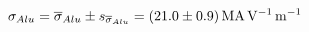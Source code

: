 
\begin{equation}
    \sigma_{Alu}
        = \overline{\sigma}_{Alu} \pm s_{\overline{\sigma}_{Alu}}
        = \SI[separate-uncertainty = true]{21.0 \pm 0. 9}{\mega\ampere\per\volt\per\meter}
\end{equation}
